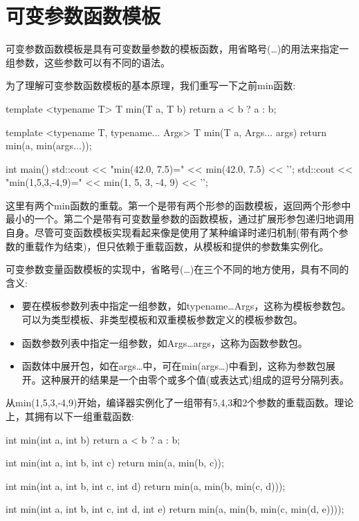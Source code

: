 \section{可变参数函数模板}
可变参数函数模板是具有可变数量参数的模板函数，用省略号(…)的用法来指定一组参数，这些参数可以有不同的语法。

为了理解可变参数函数模板的基本原理，我们重写一下之前min函数:

\begin{cpp}
template <typename T>
T min(T a, T b)
{
	return a < b ? a : b;
}

template <typename T, typename... Args>
T min(T a, Args... args)
{
	return min(a, min(args...));
}

int main()
{
	std::cout << "min(42.0, 7.5)=" << min(42.0, 7.5)
	          << '\n';
	std::cout << "min(1,5,3,-4,9)=" << min(1, 5, 3, -4, 9)
	          << '\n';
}
\end{cpp}

这里有两个min函数的重载。第一个是带有两个形参的函数模板，返回两个形参中最小的一个。第二个是带有可变数量参数的函数模板，通过扩展形参包递归地调用自身。尽管可变函数模板实现看起来像是使用了某种编译时递归机制(带有两个参数的重载作为结束)，但只依赖于重载函数，从模板和提供的参数集实例化。

可变参数变量函数模板的实现中，省略号(…)在三个不同的地方使用，具有不同的含义:

\begin{itemize}
\item
要在模板参数列表中指定一组参数，如typename…Args，这称为模板参数包。可以为类型模板、非类型模板和双重模板参数定义的模板参数包。

\item
函数参数列表中指定一组参数，如Args…args，这称为函数参数包。

\item
函数体中展开包，如在args…中，可在min(args…)中看到，这称为参数包展开。这种展开的结果是一个由零个或多个值(或表达式)组成的逗号分隔列表。
\end{itemize}

从min(1,5,3,-4,9)开始，编译器实例化了一组带有5,4,3和2个参数的重载函数。理论上，其拥有以下一组重载函数:

\begin{cpp}
int min(int a, int b)
{
	return a < b ? a : b;
}

int min(int a, int b, int c)
{
	return min(a, min(b, c));
}

int min(int a, int b, int c, int d)
{
	return min(a, min(b, min(c, d)));
}

int min(int a, int b, int c, int d, int e)
{
	return min(a, min(b, min(c, min(d, e))));
}
\end{cpp}

